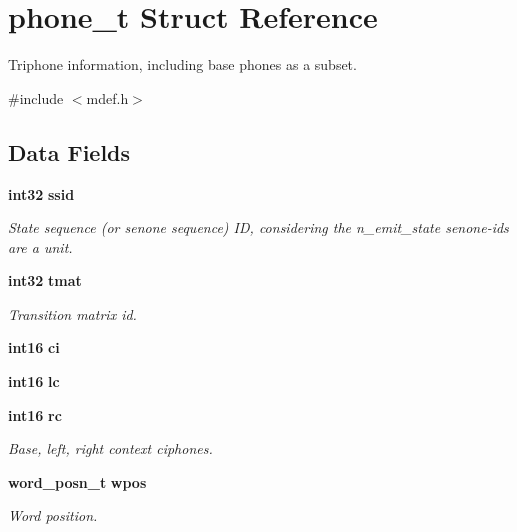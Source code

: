 \section{phone\-\_\-t \-Struct \-Reference}
\label{structphone__t}


\-Triphone information, including base phones as a subset.  




{\ttfamily \#include $<$mdef.\-h$>$}

\subsection*{\-Data \-Fields}
\begin{DoxyCompactItemize}
\item 
{\bf int32} {\bf ssid}
\begin{DoxyCompactList}\small\item\em \-State sequence (or senone sequence) \-I\-D, considering the n\-\_\-emit\-\_\-state senone-\/ids are a unit. \end{DoxyCompactList}\item 
{\bf int32} {\bf tmat}\label{structphone__t_acbe38b7fc991bfbcb745fb6131d812f0}

\begin{DoxyCompactList}\small\item\em \-Transition matrix id. \end{DoxyCompactList}\item 
{\bf int16} {\bfseries ci}\label{structphone__t_a0a895c57dccac46699fa3589e42b21d5}

\item 
{\bf int16} {\bfseries lc}\label{structphone__t_a2a473afd43114648de71a9444aa54641}

\item 
{\bf int16} {\bf rc}\label{structphone__t_a334106cbedf3d95a6bdebc4704e028cd}

\begin{DoxyCompactList}\small\item\em \-Base, left, right context ciphones. \end{DoxyCompactList}\item 
{\bf word\-\_\-posn\-\_\-t} {\bf wpos}\label{structphone__t_a5436db1dd178ef5ead83359c84963c83}

\begin{DoxyCompactList}\small\item\em \-Word position. \end{DoxyCompactList}\end{DoxyCompactItemize}


